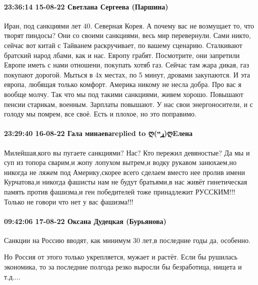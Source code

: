  
 
 
 
 

\paragraph{23:36:14 15-08-22 Светлана Сергеева (Паршина)}

Иран, под санкциями лет 40. Северная Корея. А почему вас не возмущает то, что
творят пиндосы? Они со своими санкциями, весь мир перевернули. Сами никто,
сейчас вот китай с Тайванем раскручивает, по вашему сценарию. Сталкивают
братский народ лбами, как и нас. Европу грабят. Посмотрите, они запретили
Европе иметь с нами отношени, покупать хотяб газ. Сейчас там жара дикая, газ
покупают дорогой. Мыться в 4х местах, по 5 минут, дровами закупаются. И эта
европа, любящая только комфорт. Америка никому не несла добра. Про вас я вообще
молчу. Так что мы под такими санкциями, живем хорошо. Повышают пенсии старикам,
военным. Зарплаты повышают. У нас свои энергоносители, и с голоду мы помрем,
все своё. Есть и плохое, но это поправимо.

\paragraph{23:29:40 16-08-22 Гала минаеваreplied to ღ(ړײ)ღEлена}

Милейшая,кого вы пугаете санкциями? Нас? Кто пережил девяностые? Да мы и суп из
топора сварим,и жопу лопухом вытрем,и водку рукавом занюхаем,но никогда не
ляжем под Америку,скорее всего сделаем вместо нее пролив имени Курчатова,и
никогда фашисты нам не будут братьями,в нас живёт гинетическая память против
фашизма,и ген победителей тоже принадлежит РУССКИМ!!! Только не говори что нет
у вас фашизма!!!

\paragraph{09:42:06 17-08-22 Оксана Дудецкая (Бурьянова)}

Санкции на Россию вводят, как минимум 30 лет,в последние годы да, особенно.

Но Россия от этого только укрепляется, мужает и растёт. Если бы рушилась
экономика, то за последние полгода резко выросли бы безработица, нищета и
т.д....

